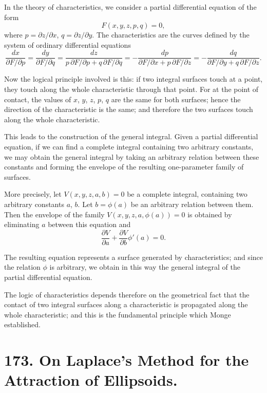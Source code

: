 \documentclass[11pt,a4paper]{article}
\theoremstyle{plain}
\begin{document}
In the theory of characteristics, we consider a partial differential equation of the form
\[
F(x,y,z,p,q) = 0,
\]
where $p=\partial z/\partial x$, $q=\partial z/\partial y$. The characteristics are the curves defined by the system of ordinary differential equations
\[
\frac{dx}{\partial F/\partial p}
= \frac{dy}{\partial F/\partial q}
= \frac{dz}{p\,\partial F/\partial p + q\,\partial F/\partial q}
= -\frac{dp}{\partial F/\partial x + p\,\partial F/\partial z}
= -\frac{dq}{\partial F/\partial y + q\,\partial F/\partial z}.
\]

Now the logical principle involved is this: if two integral surfaces touch at a point, they touch along the whole characteristic through that point. For at the point of contact, the values of $x$, $y$, $z$, $p$, $q$ are the same for both surfaces; hence the direction of the characteristic is the same; and therefore the two surfaces touch along the whole characteristic.

This leads to the construction of the general integral. Given a partial differential equation, if we can find a complete integral containing two arbitrary constants, we may obtain the general integral by taking an arbitrary relation between these constants and forming the envelope of the resulting one-parameter family of surfaces.

More precisely, let $V(x,y,z,a,b)=0$ be a complete integral, containing two arbitrary constants $a$, $b$. Let $b=\phi(a)$ be an arbitrary relation between them. Then the envelope of the family $V(x,y,z,a,\phi(a))=0$ is obtained by eliminating $a$ between this equation and
\[
\frac{\partial V}{\partial a} + \frac{\partial V}{\partial b}\phi'(a) = 0.
\]

The resulting equation represents a surface generated by characteristics; and since the relation $\phi$ is arbitrary, we obtain in this way the general integral of the partial differential equation.

The logic of characteristics depends therefore on the geometrical fact that the contact of two integral surfaces along a characteristic is propagated along the whole characteristic; and this is the fundamental principle which Monge established.


\newpage
\section*{173. On Laplace's Method for the Attraction of Ellipsoids.}
\end{document}
